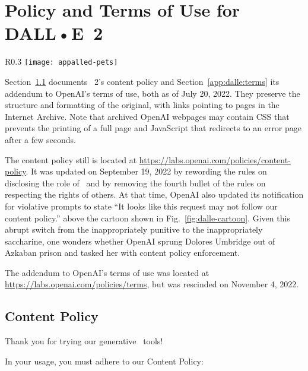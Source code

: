 \section{Policy and Terms of Use for DALL•E~2}
\label{app:dalle-sources}

\begin{wrapfigure}[9]{R}{0.3\textwidth}
\centering
\texttt{[image: appalled-pets]}
\caption{Be nice to \DALLE's pets!}\label{fig:dalle-cartoon}
\end{wrapfigure}

Section~\ref{app:dalle-content-policy} documents \DALLE~2's content policy and
Section~\ref{app:dalle:terms} its addendum to OpenAI's terms of use, both as of
July 20, 2022. They preserve the structure and formatting of the original, with
links pointing to pages in the Internet Archive. Note that archived OpenAI
webpages may contain CSS that prevents the printing of a full page and
JavaScript that redirects to an error page after a few seconds.

The content policy still is located at
\url{https://labs.openai.com/policies/content-policy}. It was updated on
September 19, 2022 by rewording the rules on disclosing the role of \AI\ and by
removing the fourth bullet of the rules on respecting the rights of others. At
that time, OpenAI also updated its notification for violative prompts to state
``It looks like this request may not follow our content policy.'' above the
cartoon shown in Fig.~\ref{fig:dalle-cartoon}. Given this abrupt switch from the
inappropriately punitive to the inappropriately saccharine, one wonders whether
OpenAI sprung Dolores Umbridge out of Azkaban prison and tasked her with content
policy enforcement.

The addendum to OpenAI's terms of use was located at
\url{https://labs.openai.com/policies/terms}, but was rescinded on November 4,
2022.


\subsection{Content Policy}
\label{app:dalle-content-policy}

Thank you for trying our generative \AI\ tools!

\noindent In your usage, you must adhere to our Content Policy:

